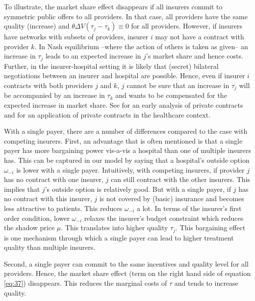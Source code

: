\documentclass[a4paper,12pt]{article}
\begin{document}
To illustrate, the market share effect disappears if all insurers commit to symmetric public offers to all providers. In that case, all providers have the same quality (increase) and \(\theta \Delta V (\tau_j - \tau_k) \equiv 0\) for all providers. However, if insurers have networks with subsets of providers, insurer \(i\) may not have a contract with provider \(k\). In Nash equilibrium --where the action of others is taken as given-- an increase in \(\tau_j\) leads to an expected increase in \(j\)'s market share and hence costs. Further, in the insurer-hospital setting it is likely that (secret) bilateral negotiations between an insurer and hospital are possible. Hence, even if insurer \(i\) contracts with both providers \(j\) and \(k\), \(j\) cannot be sure that an increase in \(\tau_j\) will be accompanied by an increase in \(\tau_k\) and wants to be compensated for the expected increase in market share. See \cite{HartTirole} for an early analysis of private contracts and \cite{BOONE2019102222} for an application of private contracts in the healthcare context.

With a single payer, there are a number of differences compared to the case with competing insurers. First, an advantage that is often mentioned is that a single payer has more bargaining power vis-a-vis a hospital than one of multiple insurers has. This can be captured in our model by saying that a hospital's outside option \(\omega_{-i}\) is lower with a single payer. Intuitively, with competing insurers, if provider \(j\) has no contract with one insurer, \(j\) can still contract with the other insurers. This implies that \(j\)'s outside option is relatively good. But with a single payer, if \(j\) has no contract with this insurer, \(j\) is not covered by (basic) insurance and becomes less attractive to patients. This reduces \(\omega_{-i}\) a lot. In terms of the insurer's first order condition, lower \(\omega_{-i}\) relaxes the insurer's budget constraint which reduces the shadow price \(\mu\). This translates into higher quality \(\tau_j\). This bargaining effect is one mechanism through which a single payer can lead to higher treatment quality than multiple insurers.

Second, a single payer can commit to the same incentives and quality level for all providers. Hence, the market share effect (term on the right hand side of equation \eqref{eq:37}) disappears. This reduces the marginal costs of \(\tau\) and tends to increase quality.
\end{document}
